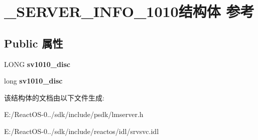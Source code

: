 \hypertarget{struct___s_e_r_v_e_r___i_n_f_o__1010}{}\section{\+\_\+\+S\+E\+R\+V\+E\+R\+\_\+\+I\+N\+F\+O\+\_\+1010结构体 参考}
\label{struct___s_e_r_v_e_r___i_n_f_o__1010}
\subsection*{Public 属性}
\begin{DoxyCompactItemize}
\item 
\mbox{\label{struct___s_e_r_v_e_r___i_n_f_o__1010_a10f39acdd9bbf337a568898474430232}} 
L\+O\+NG {\bfseries sv1010\+\_\+disc}
\item 
\mbox{\label{struct___s_e_r_v_e_r___i_n_f_o__1010_ac12945aa60b06563e6ffeb18d959e150}} 
long {\bfseries sv1010\+\_\+disc}
\end{DoxyCompactItemize}


该结构体的文档由以下文件生成\+:\begin{DoxyCompactItemize}
\item 
E\+:/\+React\+O\+S-\/0../sdk/include/psdk/lmserver.\+h\item 
E\+:/\+React\+O\+S-\/0../sdk/include/reactos/idl/srvsvc.\+idl\end{DoxyCompactItemize}
